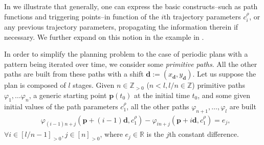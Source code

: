 In  we illustrate that generally, one can express the basic constructs--such as path functions and triggering points--in function of the $i$th trajectory parameters $c_{i}^{\rho}$, or any previous trajectory parameters, propagating the information therein if necessary. We further expand on this notion in the example in . 

In order to simplify the planning problem to the case of periodic plans with a pattern being iterated over time, we consider some \emph{primitive paths}. All the other paths are built from these paths with a shift $\mathbf{d}:=(x_{\mathbf{d}},y_{\mathbf{d}})$. Let us suppose the plan is composed of $l$ stages. Given $n\in\mathbb{Z}_{>0}$ ($n<l,l/n\in\mathbb{Z}$) primitive paths $\varphi_1,\dots\varphi_n$, a generic starting point $\mathbf{p}(t_0)$ at the initial time $t_0$, and some given initial values of the path parameters $c_1^\rho$, all the other paths $\varphi_{n+1},\dots,\varphi_l$ are built
\begin{equation}\label{eq:primitive}\begin{split}
  &\varphi_{(i-1)n+j}(\mathbf{p}+(i-1)\mathbf{d},c_1^\rho)-\varphi_{in+j}(\mathbf{p}+i\mathbf{d},c_1^\rho)=e_j,
\end{split}\end{equation}
$\forall i\in[l/n-1]_{>0},j\in[n]_{>0}$, where $e_j\in\mathbb{R}$ is the $j$th constant difference.

